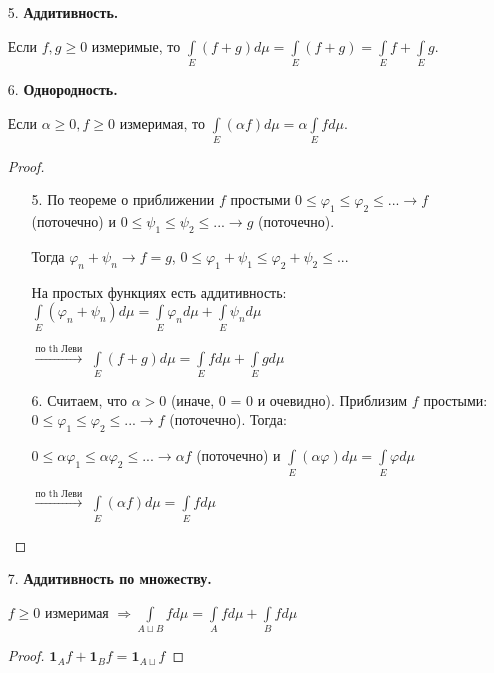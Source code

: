 \begin{enumerate}
    \item[5.] \textbf{Аддитивность.}
    
    Если $f, g\geq 0$ измеримые, то $\int \limits_E(f+g) d\mu =
    \int \limits_E(f+g)=\int \limits_E f+\int \limits_E g$.

    \item[6.] \textbf{Однородность.}
    
    Если $\alpha \geq 0, f\geq 0$ измеримая, то $\int \limits_E(\alpha f) d\mu =
    \alpha\int \limits_E f d\mu$.

    \begin{proof}~
        \begin{enumerate}
            \item[5.] По теореме о приближении $f$ простыми $0\leq \varphi_1\leq 
            \varphi_2\leq ... \rightarrow f$ (поточечно) и $0\leq \psi_1\leq \psi_2\leq ... \rightarrow g$ (поточечно).

            Тогда $\varphi_n + \psi_n \rightarrow f = g$, $0\leq \varphi_1 + \psi_1\leq \varphi_2 + \psi_2\leq ...$ 

            На простых функциях есть аддитивность: $\int\limits_E (\varphi_n + \psi_n) d\mu =\int\limits_E \varphi_n d\mu + \int\limits_E \psi_n d\mu$

            $\overset{\text{по th Леви}}{\rightarrow}$ $\int\limits_E (f + g) d\mu =\int\limits_E f d\mu + \int\limits_E g d\mu$
            
            \item[6.] Считаем, что $\alpha > 0$ (иначе, 0 = 0 и очевидно). Приблизим $f$ простыми: $0\leq \varphi_1\leq 
            \varphi_2\leq ... \rightarrow f$ (поточечно). Тогда:

            $0\leq \alpha \varphi_1\leq\alpha \varphi_2\leq ... \rightarrow \alpha f$ (поточечно) и $\int\limits_E (\alpha \varphi)d\mu =\int\limits_E \varphi d\mu $

            $\overset{\text{по th Леви}}{\rightarrow}$ $\int\limits_E (\alpha f)d\mu =\int\limits_E f d\mu $
        \end{enumerate}
    \end{proof}

    \item[7.] \textbf{Аддитивность по множеству.}
    
    $f\geq 0$ измеримая $\Rightarrow \int\limits_{A\sqcup B}f d\mu = \int\limits_A f d\mu +\int\limits_B f d\mu $

    \begin{proof}
        $\mathbf{1}_A f+\mathbf{1}_B f =\mathbf{1}_{A\sqcup} f$
    \end{proof}


\end{enumerate}
